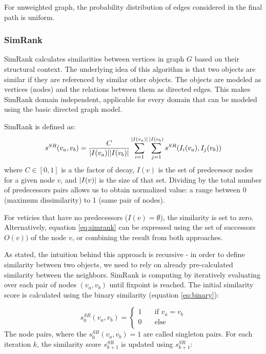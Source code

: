 For unweighted graph, the probability distribution of edges considered in the final path is uniform.

\subsubsection{SimRank}
SimRank calculates similarities between vertices in graph $G$ based on their structural context\cite{Jeh02simrank:a}.
The underlying idea of this algorithm is that two objects are similar if they are referenced by similar other objects. 
The objects are modeled as vertices (nodes) and the relations between them as directed edges.
This makes SimRank domain independent, applicable for every domain that can be modeled using the basic directed graph model.


SimRank is defined as:
\begin{equation}
	s^{SR}(v_{a},v_{b}) = \dfrac{C}{\arrowvert I(v_{a})\arrowvert \arrowvert I(v_{b})\arrowvert}
	\sum_{i=1}^{\arrowvert I(v_{a})\arrowvert}\sum_{j=1}^{\arrowvert I(v_{b})}s^{SR}(I_{i}(v_{a}), I_{j}(v_{b}))
	\label{eq:simrank}
\end{equation}
where $C \in [0,1]$ is a the factor of decay, $I(v)$ is the set of predecessor nodes for a given node $v$, 
and $\arrowvert I(v)\arrowvert$ is the size of that set.
Dividing by the total number of predecessors pairs allows us to obtain normalized value: 
a range between 0 (maximum dissimilarity)  to 1 (same pair of nodes). 

For veticies that have no predecessors ($I(v)=\emptyset$), the similarity is set to zero.
Alternatively, equation \ref{eq:simrank} can be expressed using the set of successors $O(v))$ of the node $v$,
or combining the result from both approaches.

As stated, the intuition behind this approach is recursive - 
in order to define similarity between two objects, we need to rely on already pre-calculated similarity between the neighbors.
SimRank is computing by iteratively evaluating over each pair of nodes $(v_{a},v_{b})$ until fixpoint is reached. 
The initial similarity score is  calculated using the binary similarity (equation \ref{eq:binary}):

\begin{equation}
	s_{0}^{SR}(v_{a},v_{b}) = \begin{cases}
	1  & \quad \text{if } v_{a}=v_{b} \\
	0  & \quad \text{else }\\
	\end{cases}
\end{equation}
The node pairs, where the $s_{0}^{SR}(v_{a},v_{b})=1$ are called singleton pairs.
For each iteration $k$, the similarity score $s_{k+1}^{SR}$ is updated using $s_{k+1}^{SR}$:

